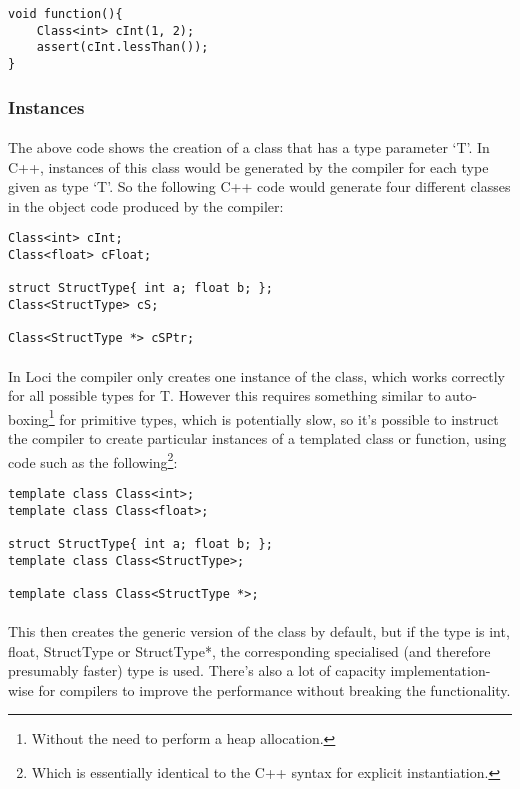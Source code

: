 \documentclass[12pt,twoside,notitlepage]{report}
\begin{document}
\begin{lstlisting}
void function(){
	Class<int> cInt(1, 2);
	assert(cInt.lessThan());
}
\end{lstlisting}


\subsubsection{Instances}

\paragraph{}
The above code shows the creation of a class that has a type parameter `T'. In C++, instances of this class would be generated by the compiler for each type given as type `T'. So the following C++ code would generate four different classes in the object code produced by the compiler:


\begin{lstlisting}
Class<int> cInt;
Class<float> cFloat;

struct StructType{ int a; float b; };
Class<StructType> cS;

Class<StructType *> cSPtr;
\end{lstlisting}


\paragraph{}
In Loci the compiler only creates one instance of the class, which works correctly for all possible types for T. However this requires something similar to auto-boxing\footnote{Without the need to perform a heap allocation.} for primitive types, which is potentially slow, so it's possible to instruct the compiler to create particular instances of a templated class or function, using code such as the following\footnote{Which is essentially identical to the C++ syntax for explicit instantiation.}:


\begin{lstlisting}
template class Class<int>;
template class Class<float>;

struct StructType{ int a; float b; };
template class Class<StructType>;

template class Class<StructType *>;
\end{lstlisting}


\paragraph{}
This then creates the generic version of the class by default, but if the type is int, float, StructType or StructType*, the corresponding specialised (and therefore presumably faster) type is used. There's also a lot of capacity implementation-wise for compilers to improve the performance without breaking the functionality.
\end{document}
